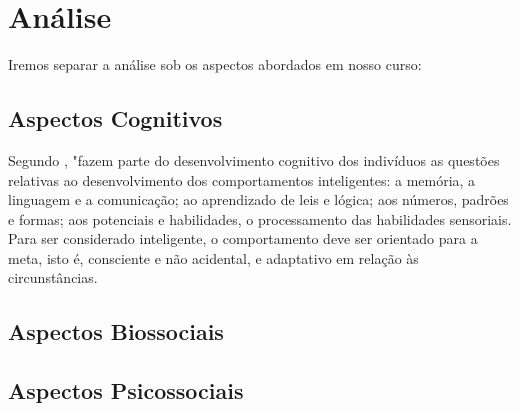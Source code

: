 \section{Análise}

Iremos separar a análise sob os aspectos abordados em nosso curso:

\subsection{Aspectos Cognitivos}

Segundo , "fazem parte do desenvolvimento cognitivo dos indivíduos as questões relativas ao desenvolvimento dos comportamentos inteligentes: a memória, a linguagem e a comunicação; ao aprendizado de leis e lógica; aos números, padrões e formas; aos potenciais e habilidades, o processamento das habilidades sensoriais. Para ser considerado inteligente, o comportamento deve ser orientado para a meta, isto é, consciente e não acidental, e adaptativo em relação às circunstâncias.



\subsection{Aspectos Biossociais}

\subsection{Aspectos Psicossociais}

